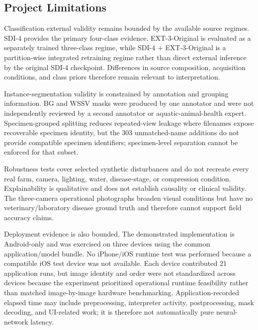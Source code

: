 \documentclass[12pt,a4paper]{report}
\newenvironment{revisionblock}{\begin{snugshade}\noindent}{\end{snugshade}}
\begin{document}
\subsection{\texorpdfstring{\colorbox{RevisionYellow}{Project Limitations}}{Project Limitations}}
\begin{revisionblock}
Classification external validity remains bounded by the available source regimes. SDI-4 provides the primary four-class evidence. EXT-3-Original is evaluated as a separately trained three-class regime, while SDI-4 + EXT-3-Original is a partition-wise integrated retraining regime rather than direct external inference by the original SDI-4 checkpoint. Differences in source composition, acquisition conditions, and class priors therefore remain relevant to interpretation.
\end{revisionblock}
\begin{revisionblock}
Instance-segmentation validity is constrained by annotation and grouping information. BG and WSSV masks were produced by one annotator and were not independently reviewed by a second annotator or aquatic-animal-health expert. Specimen-grouped splitting reduces repeated-view leakage where filenames expose recoverable specimen identity, but the 303 unmatched-name additions do not provide compatible specimen identifiers; specimen-level separation cannot be enforced for that subset.
\end{revisionblock}
\begin{revisionblock}
Robustness tests cover selected synthetic disturbances and do not recreate every real farm, camera, lighting, water, disease-stage, or compression condition. Explainability is qualitative and does not establish causality or clinical validity. The three-camera operational photographs broaden visual conditions but have no veterinary/laboratory disease ground truth and therefore cannot support field accuracy claims.
\end{revisionblock}
\begin{revisionblock}
Deployment evidence is also bounded. The demonstrated implementation is Android-only and was exercised on three devices using the common application/model bundle. No iPhone/iOS runtime test was performed because a compatible iOS test device was not available. Each device contributed 21 application runs, but image identity and order were not standardized across devices because the experiment prioritized operational runtime feasibility rather than matched image-by-image hardware benchmarking. Application-recorded elapsed time may include preprocessing, interpreter activity, postprocessing, mask decoding, and UI-related work; it is therefore not automatically pure neural-network latency.
\end{revisionblock}
\end{document}
